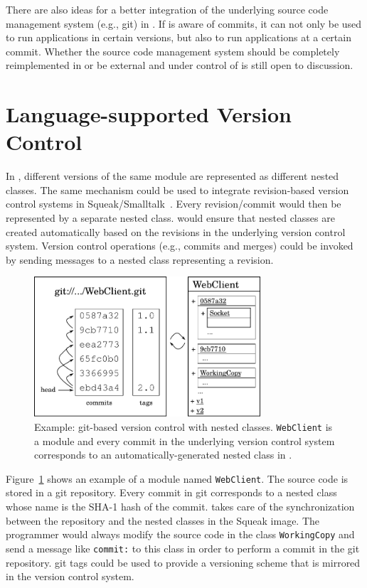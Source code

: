 There are also ideas for a better integration of the underlying source code management system (e.g., git) in \msname. If \msname is aware of commits, it can not only be used to run applications in certain versions, but also to run applications at a certain commit. Whether the source code management system should be completely reimplemented in \msname or be external and under control of \msname is still open to discussion.

\section{Language-supported Version Control}
In \msname, different versions of the same module are represented as different nested classes. The same mechanism could be used to integrate revision-based version control systems in Squeak/Smalltalk~\cite{springerniephaus}. Every revision/commit would then be represented by a separate nested class. \msname would ensure that nested classes are created automatically based on the revisions in the underlying version control system. Version control operations (e.g., commits and merges) could be invoked by sending messages to a nested class representing a revision.

\begin{figure}[!htp]
	\includegraphics[width=0.75\textwidth]{matriona_concept.pdf}
	\centering
	\caption[Example: git-based version control with nested classes.]{Example: git-based version control with nested classes. \texttt{WebClient} is a module and every commit in the underlying version control system corresponds to an automatically-generated nested class in \msname.}
	\label{fig:fut_vers_control_git}
\end{figure}

Figure~\ref{fig:fut_vers_control_git} shows an example of a module named \texttt{WebClient}. The source code is stored in a git repository. Every commit in git corresponds to a nested class whose name is the SHA-1 hash of the commit. \msname takes care of the synchronization between the repository and the nested classes in the Squeak image. The programmer would always modify the source code in the class \texttt{WorkingCopy} and send a message like \texttt{commit:} to this class in order to perform a commit in the git repository. git tags could be used to provide a versioning scheme that is mirrored in the version control system.

